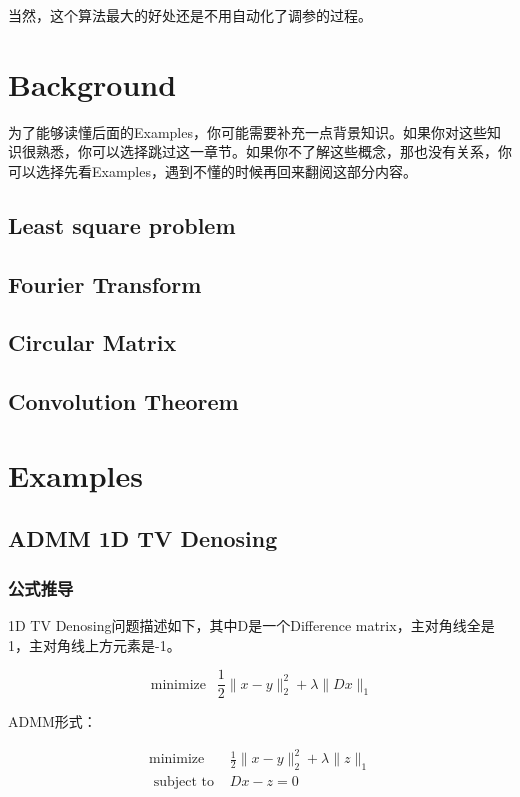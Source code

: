 \documentclass[10pt]{report}
\begin{document}
当然，这个算法最大的好处还是不用自动化了调参的过程。

\chapter{Background}

为了能够读懂后面的Examples，你可能需要补充一点背景知识。如果你对这些知识很熟悉，你可以选择跳过这一章节。如果你不了解这些概念，那也没有关系，你可以选择先看Examples，遇到不懂的时候再回来翻阅这部分内容。

\section{Least square problem}

\section{Fourier Transform}

\section{Circular Matrix}

\section{Convolution Theorem}

\chapter{Examples}

\section{ADMM 1D TV Denosing}

\subsection{公式推导}

1D TV Denosing问题描述如下，其中D是一个Difference matrix，主对角线全是1，主对角线上方元素是-1。

\begin{equation}
	\operatorname{minimize} \enspace \frac{1}{2} \|x-y\|_{2}^{2}+\lambda\|D x\|_{1}
\end{equation}

ADMM形式：

\begin{equation}
\begin{array}{ll}
\operatorname{minimize} & \frac{1}{2} \|x-y\|_{2}^{2}+\lambda\|z\|_{1} \\
\text { subject to } & D x-z=0
\end{array}
\end{equation}
\end{document}
